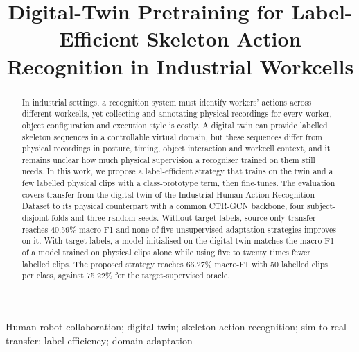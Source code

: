 \documentclass[]{interact}
\begin{document}

\title{Digital-Twin Pretraining for Label-Efficient Skeleton Action Recognition in Industrial Workcells}

\ifdefined\anonymousversion\else
\author{
}
\fi

\maketitle

\begin{abstract}
In industrial settings, a recognition system must identify workers' actions
across different workcells, yet collecting and annotating physical recordings
for every worker, object configuration and execution style is costly. A digital
twin can provide labelled skeleton sequences in a controllable virtual domain,
but these sequences differ from physical recordings in posture, timing, object
interaction and workcell context, and it remains unclear how much physical
supervision a recogniser trained on them still needs. In this work, we propose
a label-efficient strategy that trains on the twin and a few labelled physical
clips with a class-prototype term, then fine-tunes. The evaluation covers
transfer from the digital twin of the Industrial Human Action Recognition
Dataset to its physical counterpart with a common CTR-GCN backbone, four
subject-disjoint folds and three random seeds. Without target labels,
source-only transfer reaches 40.59\% macro-F1 and none of five unsupervised
adaptation strategies improves on it. With target labels, a model initialised
on the digital twin matches the macro-F1 of a model trained on physical clips
alone while using five to twenty times fewer labelled clips. The proposed
strategy reaches 66.27\% macro-F1 with 50 labelled clips per class, against
75.22\% for the target-supervised oracle.
\end{abstract}

\begin{keywords}
Human-robot collaboration; digital twin; skeleton action recognition;
sim-to-real transfer; label efficiency; domain adaptation
\end{keywords}
\end{document}
